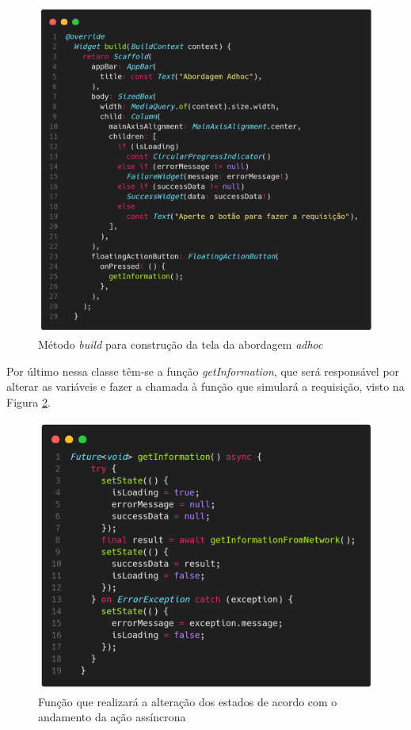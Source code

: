 \documentclass[12pt, %
openright, 
oneside, %
a4paper,    %
brazil]{facom-ufu-abntex2}
\begin{document}
\begin{figure}[ht]
    \centering
    \includegraphics[width=.65\textwidth, trim={0 30 0 100}, clip]{figures/states/adhoc_widget.png}
    \caption{Método \textit{build} para construção da tela da abordagem \textit{adhoc}}
    \label{fig:adhoc_widget}
\end{figure}

Por último nessa classe têm-se a função \textit{getInformation}, que será responsável por alterar as variáveis e fazer a chamada à função que simulará a requisição, visto na Figura \ref{fig:adhoc_getinfo}.

\begin{figure}[ht]
    \centering
    \includegraphics[width=.65\textwidth, trim={0 30 0 100}, clip]{figures/states/adhoc_getinfo.png}
    \caption{Função que realizará a alteração dos estados de acordo com o andamento da ação assíncrona}
    \label{fig:adhoc_getinfo}
\end{figure}
\end{document}
